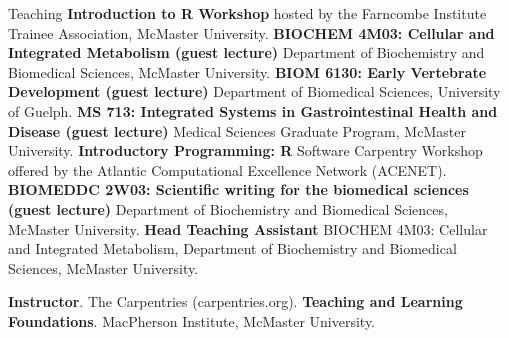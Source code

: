 \begin{rubric}{Teaching}
\entry*[2024]%
	\textbf{Introduction to R Workshop} hosted by the Farncombe Institute Trainee Association, McMaster University.
%
\entry*[2016 -- 2023]%
	\textbf{BIOCHEM 4M03: Cellular and Integrated Metabolism (guest lecture)} Department of Biochemistry and Biomedical Sciences, McMaster University.
%
\entry*[2017 -- 2022]%
	\textbf{BIOM 6130: Early Vertebrate Development (guest lecture)} Department of Biomedical Sciences, University of Guelph. 
%
\entry*[2022]%
	\textbf{MS 713: Integrated Systems in Gastrointestinal Health and Disease (guest lecture)} Medical Sciences Graduate Program, McMaster University. 
%	
\entry*[2022]%
	\textbf{Introductory Programming: R} Software Carpentry Workshop offered by the Atlantic Computational Excellence Network (ACENET). 
%
\entry*[2021]%
	\textbf{BIOMEDDC 2W03: Scientific writing for the biomedical sciences (guest lecture)} Department of Biochemistry and Biomedical Sciences, McMaster University. 
%
\entry*[2016 -- 2019]%
	\textbf{Head Teaching Assistant} BIOCHEM 4M03: Cellular and Integrated Metabolism, Department of Biochemistry and Biomedical Sciences, McMaster University.	
%	
%
%

\entry*[2024] \textbf{Instructor}. The Carpentries (carpentries.org).
\entry*[2017] \textbf{Teaching and Learning Foundations}. MacPherson Institute, McMaster University.
\end{rubric}